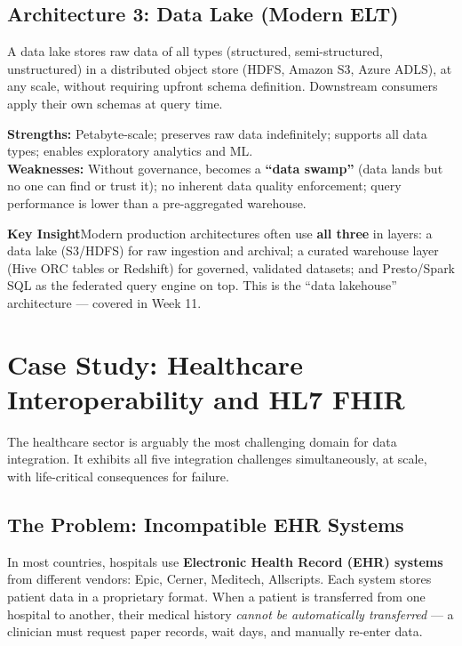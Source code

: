 \documentclass[12pt,a4paper]{article}
\newcommand{\insightbox}[1]{%
  \noindent
  \colorbox{PUGold!18}{%
    \begin{minipage}{\dimexpr\linewidth-2\fboxsep}
      \vspace{4pt}\textcolor{PUGold!70!black}{\textbf{Key Insight}}\quad #1
      \vspace{4pt}
    \end{minipage}%
  }\par\vspace{6pt}%
}
\begin{document}
\subsection{Architecture 3: Data Lake (Modern ELT)}

A data lake stores raw data of all types (structured, semi-structured, unstructured) in a distributed object store (HDFS, Amazon S3, Azure ADLS), at any scale, without requiring upfront schema definition.  Downstream consumers apply their own schemas at query time.

\textbf{Strengths:} Petabyte-scale; preserves raw data indefinitely; supports all data types; enables exploratory analytics and ML.\\
\textbf{Weaknesses:} Without governance, becomes a \textbf{``data swamp''} (data lands but no one can find or trust it); no inherent data quality enforcement; query performance is lower than a pre-aggregated warehouse.

\insightbox{Modern production architectures often use \textbf{all three} in layers: a data lake (S3/HDFS) for raw ingestion and archival; a curated warehouse layer (Hive ORC tables or Redshift) for governed, validated datasets; and Presto/Spark SQL as the federated query engine on top.  This is the ``data lakehouse'' architecture --- covered in Week 11.}

\section{Case Study: Healthcare Interoperability and HL7 FHIR}

The healthcare sector is arguably the most challenging domain for data integration.  It exhibits all five integration challenges simultaneously, at scale, with life-critical consequences for failure.

\subsection{The Problem: Incompatible EHR Systems}

In most countries, hospitals use \textbf{Electronic Health Record (EHR) systems} from different vendors: Epic, Cerner, Meditech, Allscripts.  Each system stores patient data in a proprietary format.  When a patient is transferred from one hospital to another, their medical history \textit{cannot be automatically transferred} --- a clinician must request paper records, wait days, and manually re-enter data.
\end{document}
